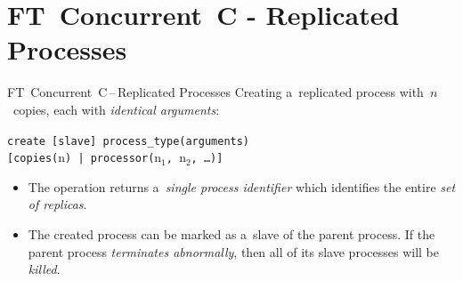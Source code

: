 \documentclass[
    10pt, hyperref={unicode, colorlinks, hypertexnames=false,
    linkcolor=white}, aspectratio=169
]{beamer}
\begin{document}
\section{FT~Concurrent~C - Replicated Processes}
\begin{frame}{FT~Concurrent~C\,--\,Replicated Processes}
    \alert{Creating a~replicated process} with~$ n $~copies, each with
    \emph{identical arguments}:

    \begin{center}
        \texttt{create [slave] process\_type(arguments)} \\
        \texttt{[copies($ \mathrm{n} $) |
        processor($ \mathrm{n_1} $, $ \mathrm{n_2} $, \ldots)]}
    \end{center}



    \vspace{1em}

    \begin{itemize}\setlength\itemsep{2em}
        \item
            The operation returns a~\emph{single process identifier}
            which identifies the entire \emph{set of replicas}.

        \item
            The created process can be marked as a~\alert{slave} of the
            parent process. If the parent process \emph{terminates abnormally},
            then all of its slave processes will be \emph{killed}.
    \end{itemize}
\end{frame}


\end{document}
